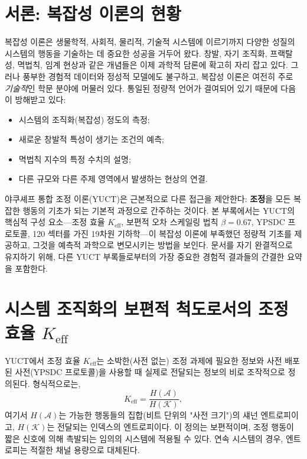 \documentclass[11pt,a4paper]{article}
\theoremstyle{remark}
\newcommand{\Keff}{K_{\mathrm{eff}}}
\begin{document}
	\tableofcontents
	\newpage
	
	\section{서론: 복잡성 이론의 현황}
	\label{sec:intro}
	
	복잡성 이론은 생물학적, 사회적, 물리적, 기술적 시스템에 이르기까지 다양한 성질의 시스템의 행동을 기술하는 데 중요한 성공을 거두어 왔다. 창발, 자기 조직화, 프랙탈성, 멱법칙, 임계 현상과 같은 개념들은 이제 과학적 담론에 확고히 자리 잡고 있다. 그러나 풍부한 경험적 데이터와 정성적 모델에도 불구하고, 복잡성 이론은 여전히 주로 \emph{기술적}인 학문 분야에 머물러 있다. 통일된 정량적 언어가 결여되어 있기 때문에 다음이 방해받고 있다:
	\begin{itemize}
		\item 시스템의 조직화(복잡성) 정도의 측정;
		\item 새로운 창발적 특성이 생기는 조건의 예측;
		\item 멱법칙 지수의 특정 수치의 설명;
		\item 다른 규모와 다른 주제 영역에서 발생하는 현상의 연결.
	\end{itemize}
	
	야쿠셰프 통합 조정 이론(YUCT)은 근본적으로 다른 접근을 제안한다: \textbf{조정}을 모든 복잡한 행동의 기초가 되는 기본적 과정으로 간주하는 것이다. 본 부록에서는 YUCT의 핵심적 구성 요소—조정 효율 \(\Keff\), 보편적 오차 스케일링 법칙 \(\beta = 0.67\), YPSDC 프로토콜, 120 섹터를 가진 19차원 기하학—이 복잡성 이론에 부족했던 정량적 기초를 제공하고, 그것을 예측적 과학으로 변모시키는 방법을 보인다. 문서를 자기 완결적으로 유지하기 위해, 다른 YUCT 부록들로부터의 가장 중요한 경험적 결과들의 간결한 요약을 포함한다.
	
	\section{시스템 조직화의 보편적 척도로서의 조정 효율 \texorpdfstring{\(\Keff\)}{Keff}}
	\label{sec:keff}
	
	YUCT에서 조정 효율 \(\Keff\)는 소박한(사전 없는) 조정 과제에 필요한 정보와 사전 배포된 사전(YPSDC 프로토콜)을 사용할 때 실제로 전달되는 정보의 비로 조작적으로 정의된다. 형식적으로는,
	\begin{equation}
		\Keff = \frac{H(\mathcal{A})}{H(\mathcal{K})},
	\end{equation}
	여기서 \(H(\mathcal{A})\)는 가능한 행동들의 집합(비트 단위의 "사전 크기")의 섀넌 엔트로피이고, \(H(\mathcal{K})\)는 전달되는 인덱스의 엔트로피이다. 이 정의는 보편적이며, 조정 행동이 짧은 신호에 의해 촉발되는 임의의 시스템에 적용될 수 있다. 연속 시스템의 경우, 엔트로피는 적절한 채널 용량으로 대체된다.
	
\end{document}
